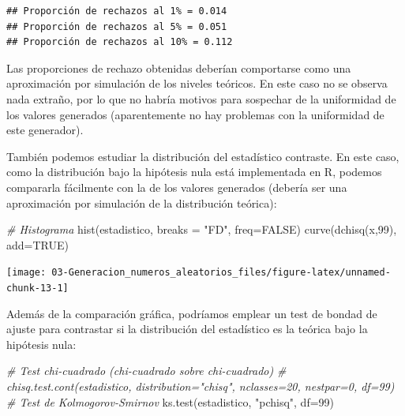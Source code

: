 \documentclass[
]{book}
\newenvironment{Shaded}{\begin{snugshade}}{\end{snugshade}}
\newcommand{\AttributeTok}[1]{\textcolor[rgb]{0.77,0.63,0.00}{#1}}
\newcommand{\CommentTok}[1]{\textcolor[rgb]{0.56,0.35,0.01}{\textit{#1}}}
\newcommand{\ConstantTok}[1]{\textcolor[rgb]{0.00,0.00,0.00}{#1}}
\newcommand{\DecValTok}[1]{\textcolor[rgb]{0.00,0.00,0.81}{#1}}
\newcommand{\FunctionTok}[1]{\textcolor[rgb]{0.00,0.00,0.00}{#1}}
\newcommand{\NormalTok}[1]{#1}
\newcommand{\StringTok}[1]{\textcolor[rgb]{0.31,0.60,0.02}{#1}}
\theoremstyle{break}
\theoremstyle{definition}
\theoremstyle{definition}
\theoremstyle{definition}
\theoremstyle{definition}
\theoremstyle{remark}
\begin{document}
\begin{verbatim}
## Proporción de rechazos al 1% = 0.014 
## Proporción de rechazos al 5% = 0.051 
## Proporción de rechazos al 10% = 0.112
\end{verbatim}

Las proporciones de rechazo obtenidas deberían comportarse como una aproximación por simulación de los niveles teóricos.
En este caso no se observa nada extraño, por lo que no habría motivos para sospechar de la uniformidad de los valores generados (aparentemente no hay problemas con la uniformidad de este generador).

También podemos estudiar la distribución del estadístico contraste.
En este caso, como la distribución bajo la hipótesis nula está implementada en R, podemos compararla fácilmente con la de los valores generados (debería ser una aproximación por simulación de la distribución teórica):

\begin{Shaded}
\begin{Highlighting}[]
\CommentTok{\# Histograma}
\FunctionTok{hist}\NormalTok{(estadistico, }\AttributeTok{breaks =} \StringTok{"FD"}\NormalTok{, }\AttributeTok{freq=}\ConstantTok{FALSE}\NormalTok{)}
\FunctionTok{curve}\NormalTok{(}\FunctionTok{dchisq}\NormalTok{(x,}\DecValTok{99}\NormalTok{), }\AttributeTok{add=}\ConstantTok{TRUE}\NormalTok{)}
\end{Highlighting}
\end{Shaded}

\begin{center}\texttt{[image: 03-Generacion\_numeros\_aleatorios\_files/figure-latex/unnamed-chunk-13-1]} \end{center}

Además de la comparación gráfica, podríamos emplear un test de bondad de ajuste para contrastar si la distribución del estadístico es la teórica bajo la hipótesis nula:

\begin{Shaded}
\begin{Highlighting}[]
\CommentTok{\# Test chi{-}cuadrado (chi{-}cuadrado sobre chi{-}cuadrado)}
\CommentTok{\# chisq.test.cont(estadistico, distribution="chisq", nclasses=20, nestpar=0, df=99)}
\CommentTok{\# Test de Kolmogorov{-}Smirnov}
\FunctionTok{ks.test}\NormalTok{(estadistico, }\StringTok{"pchisq"}\NormalTok{, }\AttributeTok{df=}\DecValTok{99}\NormalTok{)}
\end{Highlighting}
\end{Shaded}
\end{document}
